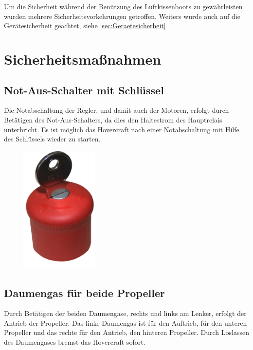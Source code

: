 
Um die Sicherheit während der Benützung des Luftkissenboots zu gewährleisten wurden mehrere Sicherheitsvorkehrungen getroffen. 
Weiters wurde auch auf die Gerätesicherheit geachtet, siehe \autoref{sec:Geraetesicherheit}
\section{Sicherheitsmaßnahmen}
\subsection{Not-Aus-Schalter mit Schlüssel}
Die Notabschaltung der Regler, und damit auch der Motoren, erfolgt durch Betätigen des Not-Aus-Schalters, da dies den Haltestrom des Hauptrelais unterbricht. 
Es ist möglich das Hovercraft nach einer Notabschaltung mit Hilfe des Schlüssels wieder zu starten. 

\begin{figure}[h]
    \centering
    \includegraphics[width=0.35\textwidth]{Fotos/Notaus.png}
\end{figure}

\newpage
\subsection{Daumengas für beide Propeller}
Durch Betätigen der beiden Daumengase, rechts und links am Lenker, erfolgt der Antrieb der Propeller. Das linke Daumengas ist für den Auftrieb, für den unteren Propeller und
das rechte für den Antrieb, den hinteren Propeller. Durch Loslassen des Daumengases bremst das Hovercraft sofort.

